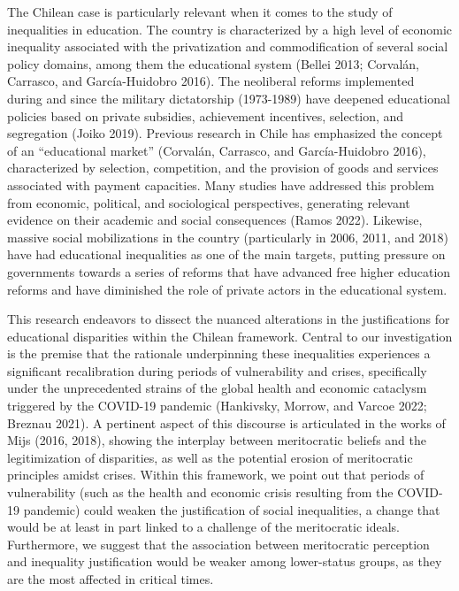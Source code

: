 \documentclass[
]{article}
\begin{document}
The Chilean case is particularly relevant when it comes to the study of
inequalities in education. The country is characterized by a high level
of economic inequality associated with the privatization and
commodification of several social policy domains, among them the
educational system (Bellei 2013; Corvalán, Carrasco, and García-Huidobro
2016). The neoliberal reforms implemented during and since the military
dictatorship (1973-1989) have deepened educational policies based on
private subsidies, achievement incentives, selection, and segregation
(Joiko 2019). Previous research in Chile has emphasized the concept of
an ``educational market'' (Corvalán, Carrasco, and García-Huidobro
2016), characterized by selection, competition, and the provision of
goods and services associated with payment capacities. Many studies have
addressed this problem from economic, political, and sociological
perspectives, generating relevant evidence on their academic and social
consequences (Ramos 2022). Likewise, massive social mobilizations in the
country (particularly in 2006, 2011, and 2018) have had educational
inequalities as one of the main targets, putting pressure on governments
towards a series of reforms that have advanced free higher education
reforms and have diminished the role of private actors in the
educational system.

This research endeavors to dissect the nuanced alterations in the
justifications for educational disparities within the Chilean framework.
Central to our investigation is the premise that the rationale
underpinning these inequalities experiences a significant recalibration
during periods of vulnerability and crises, specifically under the
unprecedented strains of the global health and economic cataclysm
triggered by the COVID-19 pandemic (Hankivsky, Morrow, and Varcoe 2022;
Breznau 2021). A pertinent aspect of this discourse is articulated in
the works of Mijs (2016, 2018), showing the interplay between
meritocratic beliefs and the legitimization of disparities, as well as
the potential erosion of meritocratic principles amidst crises. Within
this framework, we point out that periods of vulnerability (such as the
health and economic crisis resulting from the COVID-19 pandemic) could
weaken the justification of social inequalities, a change that would be
at least in part linked to a challenge of the meritocratic ideals.
Furthermore, we suggest that the association between meritocratic
perception and inequality justification would be weaker among
lower-status groups, as they are the most affected in critical times.
\end{document}
